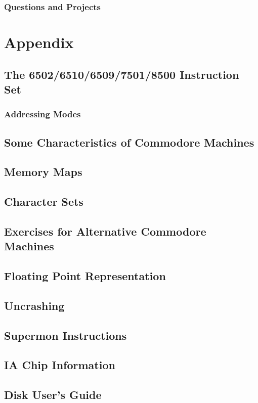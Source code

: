 \documentclass[11pt,a4paper,titlepage]{memoir}
\begin{document}
\section{Questions and Projects} 
\blindtext
\appendix
\part{Appendix}
\chapter{The 6502/6510/6509/7501/8500 Instruction Set}
\section{Addressing Modes}
\blindtext
\chapter{Some Characteristics of Commodore Machines}
\blindtext
\chapter{Memory Maps}
\blindtext
\chapter{Character Sets}
\blindtext
\chapter{Exercises for Alternative Commodore Machines}
\label{app:e_251}
\blindtext
\chapter{Floating Point Representation}
\blindtext
\chapter{Uncrashing}
\blindtext
\chapter{Supermon Instructions}
\blindtext
\chapter{IA Chip Information}
\blindtext
\chapter{Disk User's Guide}
\blindtext
\end{document}
